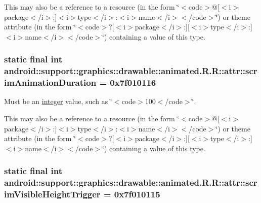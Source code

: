 This may also be a reference to a resource (in the form \char`\"{}$<$code$>$@\mbox{[}$<$i$>$package$<$/i$>$:\mbox{]}$<$i$>$type$<$/i$>$:$<$i$>$name$<$/i$>$$<$/code$>$\char`\"{}) or theme attribute (in the form \char`\"{}$<$code$>$?\mbox{[}$<$i$>$package$<$/i$>$:\mbox{]}\mbox{[}$<$i$>$type$<$/i$>$:\mbox{]}$<$i$>$name$<$/i$>$$<$/code$>$\char`\"{}) containing a value of this type. \hypertarget{classandroid_1_1support_1_1graphics_1_1drawable_1_1animated_1_1_r_1_1attr_e53719b638f5b8a2c921dbcddf09d93f}{
\subsubsection[{scrimAnimationDuration}]{\setlength{\rightskip}{0pt plus 5cm}static final int android::support::graphics::drawable::animated.R.R::attr::scrimAnimationDuration = 0x7f010116}}
\label{classandroid_1_1support_1_1graphics_1_1drawable_1_1animated_1_1_r_1_1attr_e53719b638f5b8a2c921dbcddf09d93f}


Must be an \hyperlink{classandroid_1_1support_1_1graphics_1_1drawable_1_1animated_1_1_r_1_1integer}{integer} value, such as \char`\"{}$<$code$>$100$<$/code$>$\char`\"{}. 

This may also be a reference to a resource (in the form \char`\"{}$<$code$>$@\mbox{[}$<$i$>$package$<$/i$>$:\mbox{]}$<$i$>$type$<$/i$>$:$<$i$>$name$<$/i$>$$<$/code$>$\char`\"{}) or theme attribute (in the form \char`\"{}$<$code$>$?\mbox{[}$<$i$>$package$<$/i$>$:\mbox{]}\mbox{[}$<$i$>$type$<$/i$>$:\mbox{]}$<$i$>$name$<$/i$>$$<$/code$>$\char`\"{}) containing a value of this type. \hypertarget{classandroid_1_1support_1_1graphics_1_1drawable_1_1animated_1_1_r_1_1attr_3e40f6603d8e364d05d3f1309c51b575}{
\subsubsection[{scrimVisibleHeightTrigger}]{\setlength{\rightskip}{0pt plus 5cm}static final int android::support::graphics::drawable::animated.R.R::attr::scrimVisibleHeightTrigger = 0x7f010115}}
\label{classandroid_1_1support_1_1graphics_1_1drawable_1_1animated_1_1_r_1_1attr_3e40f6603d8e364d05d3f1309c51b575}



